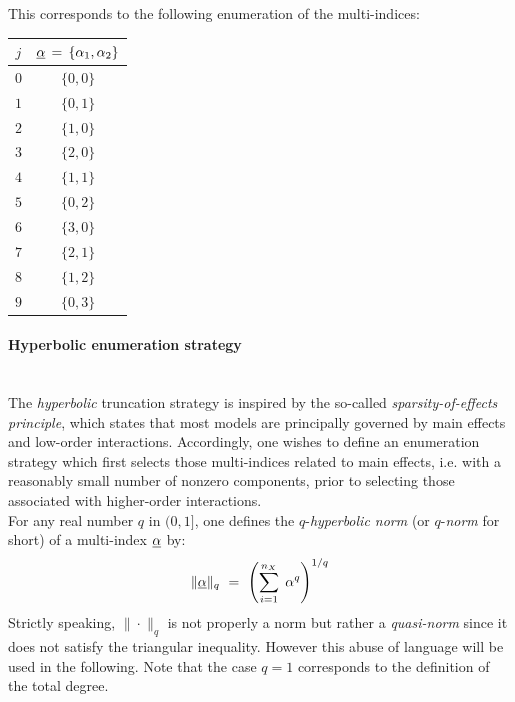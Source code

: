 {  This corresponds to the following enumeration of the multi-indices:

  \begin{center}
    \begin{tabular}{cc}
      \hline
      $j$ & $\underline{\alpha} \, = \, \{\alpha_1,\alpha_2\} $\\
      \hline
      $0$ & $\{0,0\}$ \\
      $1$ & $\{0,1\}$ \\
      $2$ & $\{1,0\}$ \\
      $3$ & $\{2,0\}$ \\
      $4$ &$ \{1,1\}$\\
      $5$ & $\{0,2\}$ \\
      $6$ & $\{3,0\}$ \\
      $7$ & $\{2,1\}$ \\
      $8$ & $\{1,2\}$ \\
      $9$ & $\{0,3\}$ \\
      \hline
    \end{tabular}
  \end{center}

  \paragraph*{Hyperbolic enumeration strategy \\ \\}
  The \emph{hyperbolic} truncation strategy is inspired by the so-called \emph{sparsity-of-effects principle}, which states that most models are principally governed by main effects and low-order interactions. Accordingly, one wishes to define an enumeration strategy which first selects those multi-indices related to main effects, i.e. with a reasonably small number of nonzero components, prior to selecting those associated with higher-order interactions. \\

  For any real number $q$ in $(0,1]$, one defines the $q$-\emph{hyperbolic norm} (or $q$-\emph{norm} for short) of a multi-index $\underline{\alpha}$ by:
\begin{equation}
  \|\underline{\alpha}\|_{q} \, \, = \, \, \left(\sum_{i=1}^{n_X} \; \alpha^q \right)^{1/q}
\end{equation}
Strictly speaking, $\|\cdot\|_q$ is not properly a norm but rather a \emph{quasi-norm} since it does not satisfy the triangular inequality. However this abuse of language will be used in the following. Note that the case $q=1$ corresponds to the definition of the total degree.  \\

}
